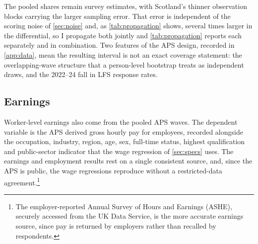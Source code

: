 The pooled shares remain survey estimates, with Scotland's thinner observation blocks carrying the larger sampling error. That error is independent of the scoring noise of \cref{sec:noise} and, as \cref{tab:propagation} shows, several times larger in the differential, so I propagate both jointly and \cref{tab:propagation} reports each separately and in combination. Two features of the APS design, recorded in \cref{app:data}, mean the resulting interval is not an exact coverage statement: the overlapping-wave structure that a person-level bootstrap treats as independent draws, and the 2022--24 fall in LFS response rates.

\subsection{Earnings}\label{sec:earnings}

Worker-level earnings also come from the pooled APS waves. The dependent variable is the APS derived gross hourly pay for employees, recorded alongside the occupation, industry, region, age, sex, full-time status, highest qualification and public-sector indicator that the wage regression of \cref{sec:specs} uses. The earnings and employment results rest on a single consistent source, and, since the APS is public, the wage regressions reproduce without a restricted-data agreement.\footnote{The employer-reported Annual Survey of Hours and Earnings (ASHE), securely accessed from the UK Data Service, is the more accurate earnings source, since pay is returned by employers rather than recalled by respondents.}